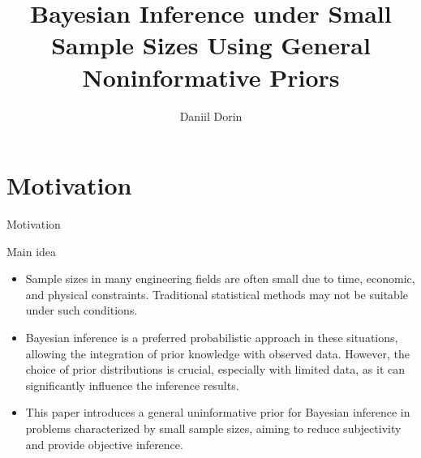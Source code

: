 \documentclass{beamer}
\title[Bayesian Inference]{Bayesian Inference under Small Sample Sizes Using General
Noninformative Priors}
\author{Daniil Dorin}
\institute{MIPT, 2024}
\begin{document}
\begin{frame}
    \titlepage
\end{frame}


\begin{frame}
    \tableofcontents
\end{frame}


\section{Motivation}
\begin{frame}{Motivation}
    \begin{block}{Main idea}
    \begin{itemize}
        \item Sample sizes in many engineering fields are often small due to time, economic, and physical constraints. Traditional statistical methods may not be suitable under such conditions.
        \item Bayesian inference is a preferred probabilistic approach in these situations, allowing the integration of prior knowledge with observed data. However, the choice of prior distributions is crucial, especially with limited data, as it can significantly influence the inference results.
        \item This paper introduces a general uninformative prior for Bayesian inference in problems characterized by small sample sizes, aiming to reduce subjectivity and provide objective inference.
    \end{itemize}
    \end{block} 
\end{frame}
\end{document}
